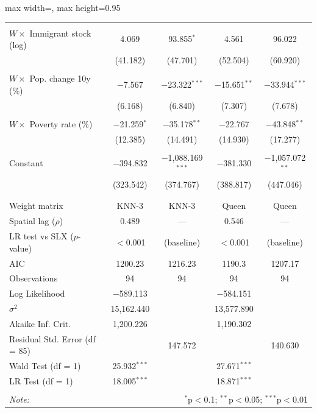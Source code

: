 \begin{table}[!htbp]
\begin{adjustbox}{max width=\linewidth, max height=0.95\textheight}
\begin{tabular}{@{\extracolsep{5pt}}lcccc}
  & & & & \\ 
 $W \times$ Immigrant stock (log) & 4.069 & 93.855$^{*}$ & 4.561 & 96.022 \\ 
  & (41.182) & (47.701) & (52.504) & (60.920) \\ 
  & & & & \\ 
 $W \times$ Pop. change 10y (\%) & $-$7.567 & $-$23.322$^{***}$ & $-$15.651$^{**}$ & $-$33.944$^{***}$ \\ 
  & (6.168) & (6.840) & (7.307) & (7.678) \\ 
  & & & & \\ 
 $W \times$ Poverty rate (\%) & $-$21.259$^{*}$ & $-$35.178$^{**}$ & $-$22.767 & $-$43.848$^{**}$ \\ 
  & (12.385) & (14.491) & (14.930) & (17.277) \\ 
  & & & & \\ 
 Constant & $-$394.832 & $-$1,088.169$^{***}$ & $-$381.330 & $-$1,057.072$^{**}$ \\ 
  & (323.542) & (374.767) & (388.817) & (447.046) \\ 
  & & & & \\ 
\hline \\[-1.8ex] 
Weight matrix & KNN-3 & KNN-3 & Queen & Queen \\ 
Spatial lag ($\rho$) & 0.489 & --- & 0.546 & --- \\ 
LR test vs SLX ($p$-value) & $<$0.001 & (baseline) & $<$0.001 & (baseline) \\ 
AIC & 1200.23 & 1216.23 & 1190.3 & 1207.17 \\ 
Observations & 94 & 94 & 94 & 94 \\ 
Log Likelihood & $-$589.113 &  & $-$584.151 &  \\ 
$\sigma^{2}$ & 15,162.440 &  & 13,577.890 &  \\ 
Akaike Inf. Crit. & 1,200.226 &  & 1,190.302 &  \\ 
Residual Std. Error (df = 85) &  & 147.572 &  & 140.630 \\ 
Wald Test (df = 1) & 25.932$^{***}$ &  & 27.671$^{***}$ &  \\ 
LR Test (df = 1) & 18.005$^{***}$ &  & 18.871$^{***}$ &  \\ 
\hline 
\hline \\[-1.8ex] 
\textit{Note:}  & \multicolumn{4}{r}{$^{*}$p$<$0.1; $^{**}$p$<$0.05; $^{***}$p$<$0.01} \\ 
\end{tabular} 
\end{adjustbox}
\end{table} 
